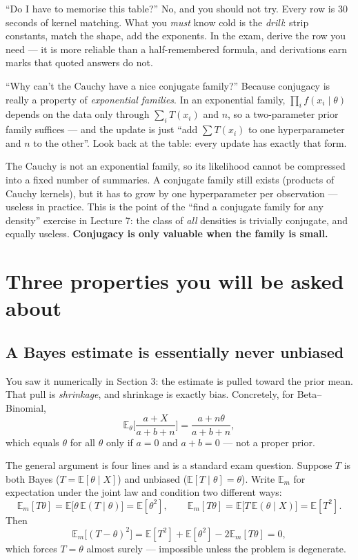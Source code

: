 \documentclass[11pt]{article}
\newcommand{\E}{\mathbb{E}}
\begin{document}
\begin{confusion}{``Do I have to memorise this table?''}
No, and you should not try. Every row is 30 seconds of kernel matching. What you \emph{must}
know cold is the \emph{drill}: strip constants, match the shape, add the exponents. In the
exam, derive the row you need --- it is more reliable than a half-remembered formula, and
derivations earn marks that quoted answers do not.
\end{confusion}

\begin{confusion}{``Why can't the Cauchy have a nice conjugate family?''}
Because conjugacy is really a property of \emph{exponential families}. In an exponential
family, $\prod_i f(x_i\mid\theta)$ depends on the data only through $\sum_iT(x_i)$ and $n$,
so a two-parameter prior family suffices --- and the update is just ``add $\sum T(x_i)$ to one
hyperparameter and $n$ to the other''. Look back at the table: every update has exactly that
form.

The Cauchy is not an exponential family, so its likelihood cannot be compressed into a fixed
number of summaries. A conjugate family still exists (products of Cauchy kernels), but it has
to grow by one hyperparameter per observation --- useless in practice. This is the point of
the ``find a conjugate family for any density'' exercise in Lecture 7: the class of \emph{all}
densities is trivially conjugate, and equally useless. \textbf{Conjugacy is only valuable
when the family is small.}
\end{confusion}

\section{Three properties you will be asked about}

\subsection{A Bayes estimate is essentially never unbiased}

You saw it numerically in Section 3: the estimate is pulled toward the prior mean. That pull
is \emph{shrinkage}, and shrinkage is exactly bias. Concretely, for Beta--Binomial,
\[
\E_\theta\Big[\frac{a+X}{a+b+n}\Big]=\frac{a+n\theta}{a+b+n},
\]
which equals $\theta$ for all $\theta$ only if $a=0$ and $a+b=0$ --- not a proper prior.

The general argument is four lines and is a standard exam question. Suppose $T$ is both
Bayes ($T=\E[\theta\mid X]$) and unbiased ($\E[T\mid\theta]=\theta$). Write $\E_m$ for
expectation under the joint law and condition two different ways:
\[
\E_m[T\theta]=\E\big[\theta\,\E(T\mid\theta)\big]=\E[\theta^2],
\qquad
\E_m[T\theta]=\E\big[T\,\E(\theta\mid X)\big]=\E[T^2].
\]
Then
\[
\E_m\big[(T-\theta)^2\big]=\E[T^2]+\E[\theta^2]-2\E_m[T\theta]=0,
\]
which forces $T=\theta$ almost surely --- impossible unless the problem is degenerate.
\end{document}
